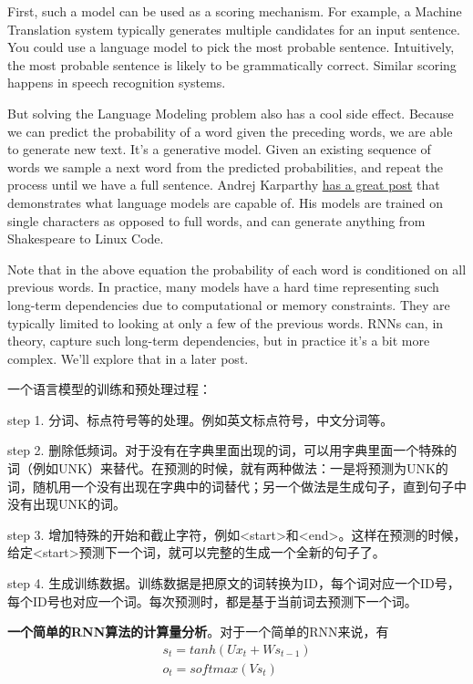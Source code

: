 \documentclass[UTF8,10pt,a4paper]{ctexbook}
\begin{document}
First, such a model can be used as a scoring mechanism. For example, a Machine Translation system typically generates multiple candidates for an input sentence. You could use a language model to pick the most probable sentence. Intuitively, the most probable sentence is likely to be grammatically correct. Similar scoring happens in speech recognition systems.

But solving the Language Modeling problem also has a cool side effect. Because we can predict the probability of a word given the preceding words, we are able to generate new text. It's a generative model. Given an existing sequence of words we sample a next word from the predicted probabilities, and repeat the process until we have a full sentence. Andrej Karparthy \href{http://karpathy.github.io/2015/05/21/rnn-effectiveness/}{has a great post} that demonstrates what language models are capable of. His models are trained on single characters as opposed to full words, and can generate anything from Shakespeare to Linux Code.

Note that in the above equation the probability of each word is conditioned on all previous words. In practice, many models have a hard time representing such long-term dependencies due to computational or memory constraints. They are typically limited to looking at only a few of the previous words. RNNs can, in theory, capture such long-term dependencies, but in practice it's a bit more complex. We'll explore that in a later post.

一个语言模型的训练和预处理过程：

step 1. 分词、标点符号等的处理。例如英文标点符号，中文分词等。

step 2. 删除低频词。对于没有在字典里面出现的词，可以用字典里面一个特殊的词（例如UNK）来替代。在预测的时候，就有两种做法：一是将预测为UNK的词，随机用一个没有出现在字典中的词替代；另一个做法是生成句子，直到句子中没有出现UNK的词。

step 3. 增加特殊的开始和截止字符，例如<start>和<end>。这样在预测的时候，给定<start>预测下一个词，就可以完整的生成一个全新的句子了。

step 4. 生成训练数据。训练数据是把原文的词转换为ID，每个词对应一个ID号，每个ID号也对应一个词。每次预测时，都是基于当前词去预测下一个词。


\textbf{一个简单的RNN算法的计算量分析}。对于一个简单的RNN来说，有
\[
\begin{aligned}
	s_{t}=tanh(Ux_{t}+Ws_{t-1}) \\
	o_{t}=softmax(Vs_{t})
\end{aligned}
\]
\end{document}
